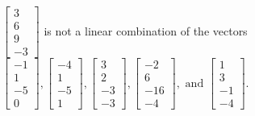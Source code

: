 \begin{exercise}
\begin{exerciseStatement}
  \end{exerciseStatement}
  \begin{exerciseAnswer}
   \(\left[\begin{array}{c}
3 \\
6 \\
9 \\
-3
\end{array}\right]\) 
  	 is not  
	a linear combination of the vectors \(\left[\begin{array}{c}
-1 \\
1 \\
-5 \\
0
\end{array}\right] , \left[\begin{array}{c}
-4 \\
1 \\
-5 \\
1
\end{array}\right] , \left[\begin{array}{c}
3 \\
2 \\
-3 \\
-3
\end{array}\right] , \left[\begin{array}{c}
-2 \\
6 \\
-16 \\
-4
\end{array}\right] , \text{ and } \left[\begin{array}{c}
1 \\
3 \\
-1 \\
-4
\end{array}\right]\).

	
  


  \end{exerciseAnswer}
\end{exercise}